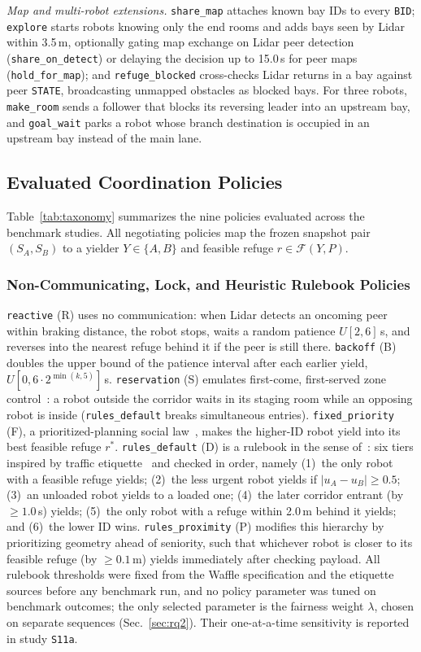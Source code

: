 \emph{Map and multi-robot extensions.} \texttt{share\_map} attaches known bay IDs to every \texttt{BID}; \texttt{explore} starts robots knowing only the end rooms and adds bays seen by Lidar within 3.5\,m, optionally gating map exchange on Lidar peer detection (\texttt{share\_on\_detect}) or delaying the decision up to 15.0\,s for peer maps (\texttt{hold\_for\_map}); and \texttt{refuge\_blocked} cross-checks Lidar returns in a bay against peer \texttt{STATE}, broadcasting unmapped obstacles as blocked bays. For three robots, \texttt{make\_room} sends a follower that blocks its reversing leader into an upstream bay, and \texttt{goal\_wait} parks a robot whose branch destination is occupied in an upstream bay instead of the main lane.

\subsection{Evaluated Coordination Policies}\label{sec:pol}
Table~\ref{tab:taxonomy} summarizes the nine policies evaluated across the benchmark studies. All negotiating policies map the frozen snapshot pair $(S_A, S_B)$ to a yielder $Y \in \{A, B\}$ and feasible refuge $r \in \mathcal{F}(Y, P)$.

\subsubsection{Non-Communicating, Lock, and Heuristic Rulebook Policies}
\texttt{reactive} (R) uses no communication: when Lidar detects an oncoming peer within braking distance, the robot stops, waits a random patience $U[2,6]$\,s, and reverses into the nearest refuge behind it if the peer is still there. \texttt{backoff} (B) doubles the upper bound of the patience interval after each earlier yield, $U[0, 6\cdot2^{\min(k,5)}]$\,s.
\texttt{reservation} (S) emulates first-come, first-served zone control~\cite{fanti2002event}: a robot outside the corridor waits in its staging room while an opposing robot is inside (\texttt{rules\_default} breaks simultaneous entries). \texttt{fixed\_priority} (F), a prioritized-planning social law~\cite{cap2015prioritized}, makes the higher-ID robot yield into its best feasible refuge $r^\ast$.
\texttt{rules\_default} (D) is a rulebook in the sense of~\cite{censi2019rulebooks}: six tiers inspired by traffic etiquette~\cite{kato1992coordinating,highwaycode} and checked in order, namely (1)~the only robot with a feasible refuge yields; (2)~the less urgent robot yields if $|u_A - u_B| \ge 0.5$; (3)~an unloaded robot yields to a loaded one; (4)~the later corridor entrant (by $\ge 1.0$\,s) yields; (5)~the only robot with a refuge within 2.0\,m behind it yields; and (6)~the lower ID wins.
\texttt{rules\_proximity} (P) modifies this hierarchy by prioritizing geometry ahead of seniority, such that whichever robot is closer to its feasible refuge (by $\ge 0.1$\,m) yields immediately after checking payload. All rulebook thresholds were fixed from the Waffle specification and the etiquette sources before any benchmark run, and no policy parameter was tuned on benchmark outcomes; the only selected parameter is the fairness weight $\lambda$, chosen on separate sequences (Sec.~\ref{sec:rq2}). Their one-at-a-time sensitivity is reported in study \texttt{S11a}.

